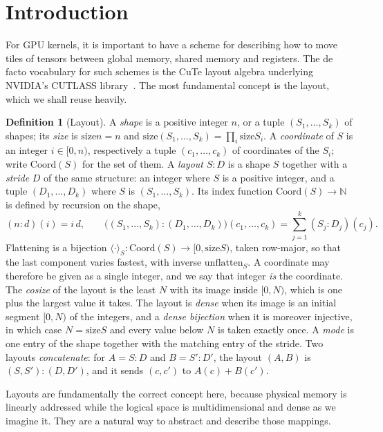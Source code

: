 \documentclass[11pt]{article}
\theoremstyle{definition}
\newtheorem{definition}{Definition}
\newcommand{\size}{\mathrm{size}}
\newcommand{\canon}[2]{\langle #1 \rangle_{#2}}
\newcommand{\N}{\mathbb{N}}
\begin{document}
\section{Introduction}\label{sec:intro}

For GPU kernels, it is important to have a scheme for describing how to move
tiles of tensors between global memory, shared memory and registers. The de
facto vocabulary for such schemes is the CuTe layout algebra underlying
NVIDIA's CUTLASS library~\cite{cutedocs,cecka}. The most fundamental concept
is the layout, which we shall reuse heavily.

\begin{definition}[Layout]\label{def:layout}
A \emph{shape} is a positive integer $n$, or a tuple $(S_1,\dots,S_k)$ of
shapes; its \emph{size} is $\size n = n$ and
$\size (S_1,\dots,S_k) = \prod_i \size S_i$. A \emph{coordinate} of $S$ is
an integer $i \in [0,n)$, respectively a tuple $(c_1,\dots,c_k)$ of
coordinates of the $S_i$; write $\mathrm{Coord}(S)$ for the set of them. A
\emph{layout} $S{:}D$ is a shape $S$ together with a \emph{stride} $D$ of the
same structure: an integer where $S$ is a positive integer, and a tuple
$(D_1,\dots,D_k)$ where $S$ is $(S_1,\dots,S_k)$. Its index function
$\mathrm{Coord}(S) \to \N$ is defined by recursion on the shape,
\[
(n{:}d)(i) = i\,d,
\qquad
\big((S_1,\dots,S_k){:}(D_1,\dots,D_k)\big)(c_1,\dots,c_k)
= \sum_{j=1}^{k} (S_j{:}D_j)(c_j).
\] Flattening is a bijection $\canon{\cdot}{S} : \mathrm{Coord}(S) \to
[0,\size S)$, taken row-major, so that the last component varies fastest, with
inverse $\mathrm{unflatten}_S$. A coordinate may therefore be given as a single
integer, and we say that integer \emph{is} the coordinate. The \emph{cosize} of the layout is the least $N$ with its
image inside $[0,N)$, which is one plus the largest value it takes. The layout
is \emph{dense} when its image is an initial segment $[0,N)$ of the integers,
and a \emph{dense bijection} when it is moreover injective, in which case
$N = \size S$ and every value below $N$ is taken exactly once. A
\emph{mode} is one entry of the shape together with the matching entry of the
stride. Two layouts \emph{concatenate}: for $A = S{:}D$ and $B = S'{:}D'$, the
layout $(A,B)$ is $(S,S'){:}(D,D')$, and it sends $(c,c')$ to $A(c) + B(c')$.
\end{definition}

Layouts are fundamentally the correct concept here, because physical memory is
linearly addressed while the logical space is multidimensional and dense as we
imagine it. They are a natural way to abstract and describe those mappings.
\end{document}

